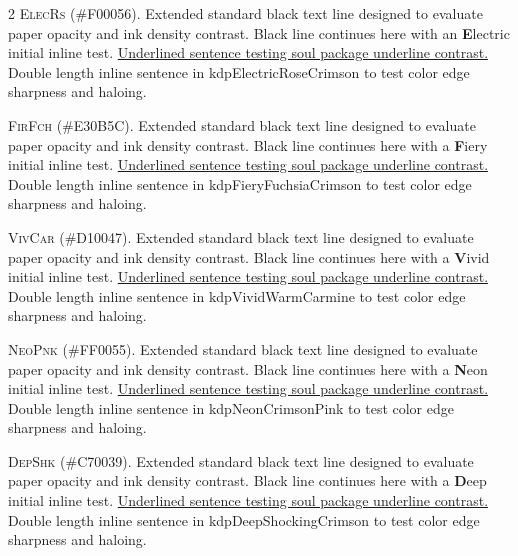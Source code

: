 \documentclass[9pt]{article}
\let\oldlettrine\lettrine
\renewcommand{\lettrine}[3][]{%
	\clubpenalty=10000
	\oldlettrine[#1]{#2}{#3}%
}
\begin{document}
\begin{multicols}{2}
\lettrine[lines=2]{\textcolor{kdpElectricRoseCrimson}{E}}{lecRs} (\#F00056). Extended standard black text line designed to evaluate paper opacity and ink density contrast. Black line continues here with an \textbf{\textcolor{kdpElectricRoseCrimson}{E}}lectric initial inline test. \ul{Underlined sentence testing soul package underline contrast.} \textcolor{kdpElectricRoseCrimson}{Double length inline sentence in kdpElectricRoseCrimson to test color edge sharpness and haloing.}
\medskip

\lettrine[lines=2]{\textcolor{kdpFieryFuchsiaCrimson}{F}}{irFch} (\#E30B5C). Extended standard black text line designed to evaluate paper opacity and ink density contrast. Black line continues here with a \textbf{\textcolor{kdpFieryFuchsiaCrimson}{F}}iery initial inline test. \ul{Underlined sentence testing soul package underline contrast.} \textcolor{kdpFieryFuchsiaCrimson}{Double length inline sentence in kdpFieryFuchsiaCrimson to test color edge sharpness and haloing.}
\medskip

\lettrine[lines=2]{\textcolor{kdpVividWarmCarmine}{V}}{ivCar} (\#D10047). Extended standard black text line designed to evaluate paper opacity and ink density contrast. Black line continues here with a \textbf{\textcolor{kdpVividWarmCarmine}{V}}ivid initial inline test. \ul{Underlined sentence testing soul package underline contrast.} \textcolor{kdpVividWarmCarmine}{Double length inline sentence in kdpVividWarmCarmine to test color edge sharpness and haloing.}
\medskip

\lettrine[lines=2]{\textcolor{kdpNeonCrimsonPink}{N}}{eoPnk} (\#FF0055). Extended standard black text line designed to evaluate paper opacity and ink density contrast. Black line continues here with a \textbf{\textcolor{kdpNeonCrimsonPink}{N}}eon initial inline test. \ul{Underlined sentence testing soul package underline contrast.} \textcolor{kdpNeonCrimsonPink}{Double length inline sentence in kdpNeonCrimsonPink to test color edge sharpness and haloing.}
\medskip

\lettrine[lines=2]{\textcolor{kdpDeepShockingCrimson}{D}}{epShk} (\#C70039). Extended standard black text line designed to evaluate paper opacity and ink density contrast. Black line continues here with a \textbf{\textcolor{kdpDeepShockingCrimson}{D}}eep initial inline test. \ul{Underlined sentence testing soul package underline contrast.} \textcolor{kdpDeepShockingCrimson}{Double length inline sentence in kdpDeepShockingCrimson to test color edge sharpness and haloing.}
\medskip


\end{multicols}
\end{document}

